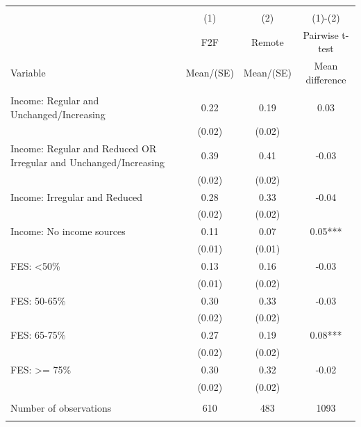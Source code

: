 
\begin{tabular}{@{\extracolsep{5pt}}lccc}
\\[-1.8ex]\hline \hline \\[-1.8ex]
 & \multicolumn{1}{c}{(1)}  & \multicolumn{1}{c}{(2)}  & \multicolumn{1}{c}{(1)-(2)} \\
 & \multicolumn{1}{c}{F2F}  & \multicolumn{1}{c}{Remote}  & \multicolumn{1}{c}{Pairwise t-test}  \\
Variable & Mean/(SE) & Mean/(SE) & Mean difference \\ \hline \\[-1.8ex] 
Income: Regular and Unchanged/Increasing   & 0.22    & 0.19    & 0.03   \\
 & (0.02)  & (0.02)  &  \\ [1ex]
Income: Regular and Reduced OR Irregular and Unchanged/Increasing   & 0.39    & 0.41    & -0.03   \\
 & (0.02)  & (0.02)  &  \\ [1ex]
Income: Irregular and Reduced   & 0.28    & 0.33    & -0.04   \\
 & (0.02)  & (0.02)  &  \\ [1ex]
Income: No income sources   & 0.11    & 0.07    & 0.05***   \\
 & (0.01)  & (0.01)  &  \\ [1ex]
FES: <50\%   & 0.13    & 0.16    & -0.03   \\
 & (0.01)  & (0.02)  &  \\ [1ex]
FES: 50-65\%   & 0.30    & 0.33    & -0.03   \\
 & (0.02)  & (0.02)  &  \\ [1ex]
FES: 65-75\%   & 0.27    & 0.19    & 0.08***   \\
 & (0.02)  & (0.02)  &  \\ [1ex]
FES: >= 75\%   & 0.30    & 0.32    & -0.02   \\
 & (0.02)  & (0.02)  &  \\ [1ex]
\hline \\[-1.8ex]
Number of observations  & 610   & 483  & 1093  \\
\hline \hline \\[-1.8ex]

\end{tabular}
